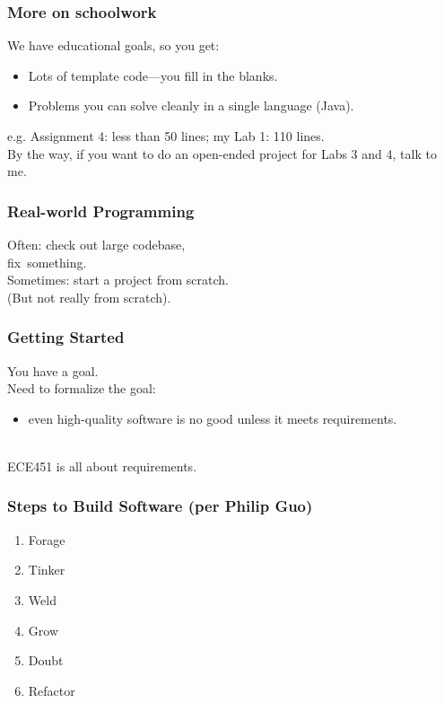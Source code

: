 \begin{frame}
\frametitle{More on schoolwork}

\begin{changemargin}{1.5cm}
We have educational goals, so you get:
\begin{itemize}
\item Lots of template code---you fill in the blanks.
\item Problems you can solve cleanly in a single language (Java).
\end{itemize}

e.g. Assignment 4: less than 50 lines; my Lab 1: 110 lines.\\[1em]

By the way, if you want to do an open-ended project for Labs 3 and 4,
talk to me.

\end{changemargin}

\end{frame}

\begin{frame}
\frametitle{Real-world Programming}

\Large
\begin{changemargin}{2cm}
Often: check out large codebase, \\ \qquad fix~something.\\[1em]

Sometimes: start a project from scratch.\\
\qquad (But not really from scratch).
\end{changemargin}
\end{frame}

\begin{frame}
\frametitle{Getting Started}

\begin{changemargin}{1cm}
\Large
You have a goal.\\[1em]

Need to formalize the goal:
\begin{itemize}
\item even high-quality software is no good unless it meets requirements.
\end{itemize}
~\\[1em]
ECE451 is all about requirements.
\end{changemargin}

\end{frame}

\begin{frame}
\frametitle{Steps to Build Software (per Philip Guo)}

\begin{changemargin}{1cm}
\Huge
\begin{enumerate}
\item Forage
\item Tinker
\item Weld
\item Grow
\item Doubt
\item Refactor
\end{enumerate}
\end{changemargin}

\end{frame}

